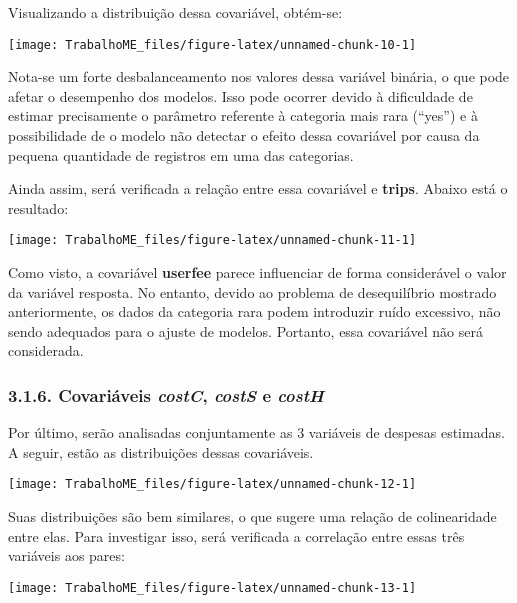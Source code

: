\documentclass[
]{article}
\begin{document}
Visualizando a distribuição dessa covariável, obtém-se:

\begin{center}\texttt{[image: TrabalhoME\_files/figure-latex/unnamed-chunk-10-1]} \end{center}

Nota-se um forte desbalanceamento nos valores dessa variável binária, o
que pode afetar o desempenho dos modelos. Isso pode ocorrer devido à
dificuldade de estimar precisamente o parâmetro referente à categoria
mais rara (``yes'') e à possibilidade de o modelo não detectar o efeito
dessa covariável por causa da pequena quantidade de registros em uma das
categorias.

Ainda assim, será verificada a relação entre essa covariável e
\textbf{trips}. Abaixo está o resultado:

\begin{center}\texttt{[image: TrabalhoME\_files/figure-latex/unnamed-chunk-11-1]} \end{center}

Como visto, a covariável \textbf{userfee} parece influenciar de forma
considerável o valor da variável resposta. No entanto, devido ao
problema de desequilíbrio mostrado anteriormente, os dados da categoria
rara podem introduzir ruído excessivo, não sendo adequados para o ajuste
de modelos. Portanto, essa covariável não será considerada.

\subsubsection{\texorpdfstring{3.1.6. Covariáveis \emph{costC},
\emph{costS} e
\emph{costH}}{3.1.6. Covariáveis costC, costS e costH}}\label{covariuxe1veis-costc-costs-e-costh}

Por último, serão analisadas conjuntamente as 3 variáveis de despesas
estimadas. A seguir, estão as distribuições dessas covariáveis.

\begin{center}\texttt{[image: TrabalhoME\_files/figure-latex/unnamed-chunk-12-1]} \end{center}

Suas distribuições são bem similares, o que sugere uma relação de
colinearidade entre elas. Para investigar isso, será verificada a
correlação entre essas três variáveis aos pares:

\begin{center}\texttt{[image: TrabalhoME\_files/figure-latex/unnamed-chunk-13-1]} \end{center}
\end{document}

